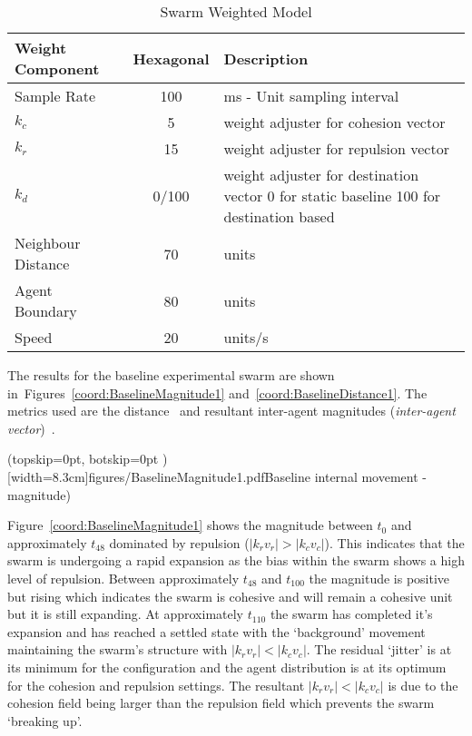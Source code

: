 \documentclass{ieeeaccess}
\begin{document}
\begin{table}
\begin{center}
\begin{tabular}{| p{1.5cm} | c | p{3.5cm} |}
\hline
\bf Weight \bf Component & \bf Hexagonal & \bf Description \\ \hline
Sample Rate & 100 & ms - Unit sampling interval\\  \hline
$k_c$ & 5 & weight adjuster for cohesion vector\\  \hline
$k_r$ & 15 & weight adjuster for repulsion  vector\\  \hline
$k_d$ & 0/100 & weight adjuster for destination vector 0 for static baseline 100 for destination based\\  \hline
Neighbour Distance & 70 & units\\  \hline
Agent Boundary & 80 & units\\  \hline
Speed & 20 & units/s\\  \hline
\end{tabular}\caption{Swarm Weighted Model} \label{tab:DynamicPhysics1}
\end{center}
\end{table}

The results for the baseline experimental swarm are shown in~Figures~\ref{coord:BaselineMagnitude1} and~\ref{coord:BaselineDistance1}. The metrics used are the distance~\cite{NIM:09} and resultant inter-agent magnitudes (\textit{inter-agent vector})~\cite{EKB:18}.


\Figure[t!](topskip=0pt, botskip=0pt )[width=8.3cm]{figures/BaselineMagnitude1.pdf}{Baseline internal movement - magnitude)\label{coord:BaselineMagnitude1}}

Figure~\ref{coord:BaselineMagnitude1} shows the magnitude between $t_0$ and approximately $t_{48}$ dominated by repulsion ($|k_rv_r| > |k_cv_c|$). This indicates that the swarm is undergoing a rapid expansion as the bias within the swarm shows a high level of repulsion. Between approximately $t_{48}$ and $t_{100}$ the magnitude is positive but rising which indicates the swarm is cohesive and will remain a cohesive unit but it is still expanding. At approximately $t_{110}$ the swarm has completed it's expansion and has reached a settled state with the `background' movement maintaining the swarm's structure with $|k_rv_r| < |k_cv_c|$. The residual `jitter' is at its minimum for the configuration and the agent distribution is at its optimum for the cohesion and repulsion settings. The resultant $|k_rv_r| < |k_cv_c|$ is due to the cohesion field being larger than the repulsion field which prevents the swarm `breaking up'. 
\end{document}
